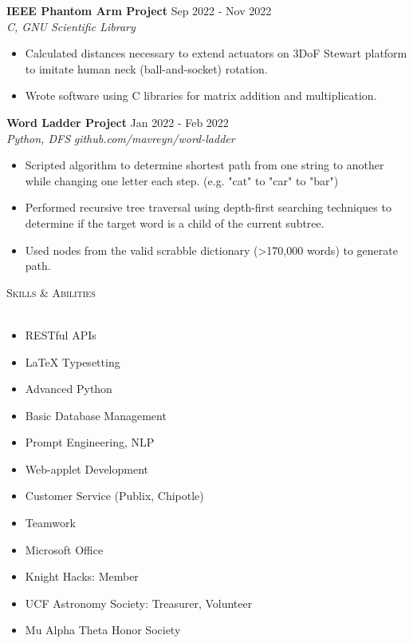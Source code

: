 \documentclass[letterpaper]{article}
\newcommand{\lineunder} {
    \vspace*{-8pt} \\
    \hspace*{-18pt} \hrulefill \\
}
\newcommand{\header} [1] {
    {\hspace*{-18pt}\vspace*{12pt} \large\textsc{#1}}
    \vspace*{-12pt} \lineunder
}
\begin{document}
\textbf{IEEE Phantom Arm Project} \hfill Sep 2022 - Nov 2022\\
\textit{C, GNU Scientific Library} \\
\vspace{-1mm}
\begin{itemize} \itemsep 1pt
	\item Calculated distances necessary to extend actuators on 3DoF Stewart platform to imitate human neck (ball-and-socket) rotation.
	\item Wrote software using C libraries for matrix addition and multiplication.
\end{itemize}

\textbf{Word Ladder Project} \hfill Jan 2022 - Feb 2022\\
\textit{Python, DFS} \hfill \textit{github.com/mavreyn/word-ladder}\\
\vspace{-1mm}
\begin{itemize} \itemsep 1pt
	\item Scripted algorithm to determine shortest path from one string to another while changing one letter each step. (e.g. "cat" to "car" to "bar")
	\item Performed recursive tree traversal using depth-first searching techniques to determine if the target word is a child of the current subtree.
    \item Used nodes from the valid scrabble dictionary (>170,000 words) to generate path.
\end{itemize}

\vspace{2mm}


\header{Skills \& Abilities}
\begin{multicols}{2}
    \begin{itemize} \itemsep 1pt
        \item RESTful APIs
        \item LaTeX Typesetting
        \item Advanced Python
        \item Basic Database Management
        \item Prompt Engineering, NLP
        \item Web-applet Development
        \item Customer Service (Publix, Chipotle)
        \item Teamwork
        \item Microsoft Office
        \item Knight Hacks: Member
        \item UCF Astronomy Society: Treasurer, Volunteer
        \item Mu Alpha Theta Honor Society
    \end{itemize}
\end{multicols}
\end{document}
